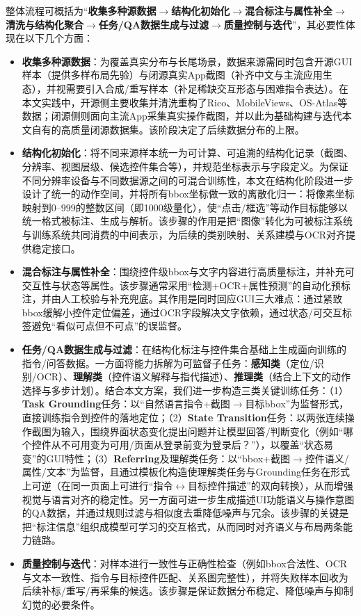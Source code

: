 整体流程可概括为“\textbf{收集多种源数据$\rightarrow$结构化初始化$\rightarrow$混合标注与属性补全$\rightarrow$清洗与结构化聚合$\rightarrow$任务/QA数据生成与过滤$\rightarrow$质量控制与迭代}”，其必要性体现在以下几个方面：
\begin{itemize}
  \item \textbf{收集多种源数据}：为覆盖真实分布与长尾场景，数据来源需同时包含开源GUI样本（提供多样布局先验）与闭源真实App截图（补齐中文与主流应用生态），并视需要引入合成/重写样本（补足稀缺交互形态与困难指令表达）。在本文实践中，开源侧主要收集并清洗重构了Rico、MobileViews、OS-Atlas等数据；闭源侧则面向主流App采集真实操作截图，并以此为基础构建与迭代本文自有的高质量闭源数据集。该阶段决定了后续数据分布的上限。
  \item \textbf{结构化初始化}：将不同来源样本统一为可计算、可追溯的结构化记录（截图、分辨率、视图层级、候选控件集合等），并规范坐标表示与字段定义。为保证不同分辨率设备与不同数据源之间的可混合训练性，本文在结构化阶段进一步设计了统一的动作空间，并将所有bbox坐标做一致的离散化归一：将像素坐标映射到$0\text{--}999$的整数区间（即1000级量化），使“点击/框选”等动作目标能够以统一格式被标注、生成与解析。该步骤的作用是把“图像”转化为可被标注系统与训练系统共同消费的中间表示，为后续的类别映射、关系建模与OCR对齐提供稳定接口。
  \item \textbf{混合标注与属性补全}：围绕控件级bbox与文字内容进行高质量标注，并补充可交互性与状态等属性。该步骤通常采用“检测+OCR+属性预测”的自动化预标注，并由人工校验与补充兜底。其作用是同时回应GUI三大难点：通过紧致bbox缓解小控件定位偏差，通过OCR字段解决文字依赖，通过状态/可交互标签避免“看似可点但不可点”的误监督。
  \item \textbf{任务/QA数据生成与过滤}：在结构化标注与控件集合基础上生成面向训练的指令/问答数据。一方面将能力拆解为可监督子任务：\textbf{感知类}（定位/识别/OCR）、\textbf{理解类}（控件语义解释与指代描述）、\textbf{推理类}（结合上下文的动作选择与多步计划）。结合本文方案，我们进一步构造三类关键训练任务：（1）\textbf{Task Grounding}任务：以“自然语言指令+截图$\rightarrow$目标bbox”为监督形式，直接训练指令到控件的落地定位；（2）\textbf{State Transition}任务：以两张连续操作截图为输入，围绕界面状态变化提出问题并让模型回答/判断变化（例如“哪个控件从不可用变为可用/页面从登录前变为登录后？”），以覆盖“状态易变”的GUI特性；（3）\textbf{Referring}及理解类任务：以“bbox+截图$\rightarrow$控件语义/属性/文本”为监督，且通过模板化构造使理解类任务与Grounding任务在形式上可逆（在同一页面上可进行“指令$\leftrightarrow$目标控件描述”的双向转换），从而增强视觉与语言对齐的稳定性。另一方面可进一步生成描述UI功能语义与操作意图的QA数据，并通过规则过滤与相似度去重降低噪声与冗余。该步骤的关键是把“标注信息”组织成模型可学习的交互格式，从而同时对齐语义与布局两条能力链路。
  \item \textbf{质量控制与迭代}：对样本进行一致性与正确性检查（例如bbox合法性、OCR与文本一致性、指令与目标控件匹配、关系图完整性），并将失败样本回收为后续补标/重写/再采集的候选。该步骤是保证数据分布稳定、降低噪声与抑制幻觉的必要条件。
\end{itemize}

